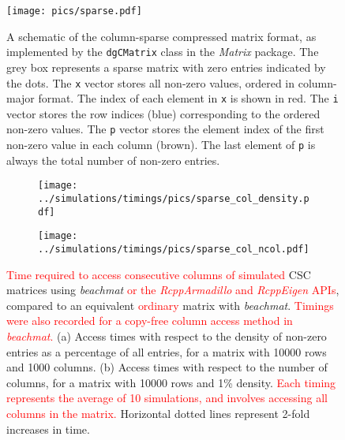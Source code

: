 \documentclass{article}
\newcommand{\beachmat}{\textit{beachmat}}
\newcommand{\revised}[1]{\textcolor{red}{#1}}
\begin{document}
\begin{figure}[bt]
    \centering
    \texttt{[image: pics/sparse.pdf]}
    \caption{A schematic of the column-sparse compressed matrix format, as implemented by the \texttt{dgCMatrix} class in the \textit{Matrix} package.
        The grey box represents a sparse matrix with zero entries indicated by the dots.
        The \texttt{x} vector stores all non-zero values, ordered in column-major format.
        The index of each element in \texttt{x} is shown in red.
        The \texttt{i} vector stores the row indices (blue) corresponding to the ordered non-zero values.
        The \texttt{p} vector stores the element index of the first non-zero value in each column (brown).
        The last element of \texttt{p} is always the total number of non-zero entries.
    }
    \label{fig:sparsefig}
\end{figure}

\begin{figure}[bt]
    \centering
    \begin{subfigure}[b]{0.49\textwidth}
        \texttt{[image: ../simulations/timings/pics/sparse\_col\_density.pdf]}
        \caption{}
    \end{subfigure}
    \begin{subfigure}[b]{0.49\textwidth}
        \texttt{[image: ../simulations/timings/pics/sparse\_col\_ncol.pdf]}
        \caption{}
    \end{subfigure}
    \caption{\revised{Time required to access consecutive columns of simulated} CSC matrices using \beachmat{} \revised{or the \textit{RcppArmadillo} and \textit{RcppEigen} APIs}, compared to an equivalent \revised{ordinary} matrix with \beachmat{}.
        \revised{Timings were also recorded for a copy-free column access method in \beachmat{}.}
        (a) Access times with respect to the density of non-zero entries as a percentage of all entries, for a matrix with 10000 rows and 1000 columns.
        (b) Access times with respect to the number of columns, for a matrix with 10000 rows and 1\% density.
        \revised{Each timing represents the average of 10 simulations, and involves accessing all columns in the matrix.}
        Horizontal dotted lines represent 2-fold increases in time.
    }
    \label{fig:sparsecol}
\end{figure}
\end{document}
